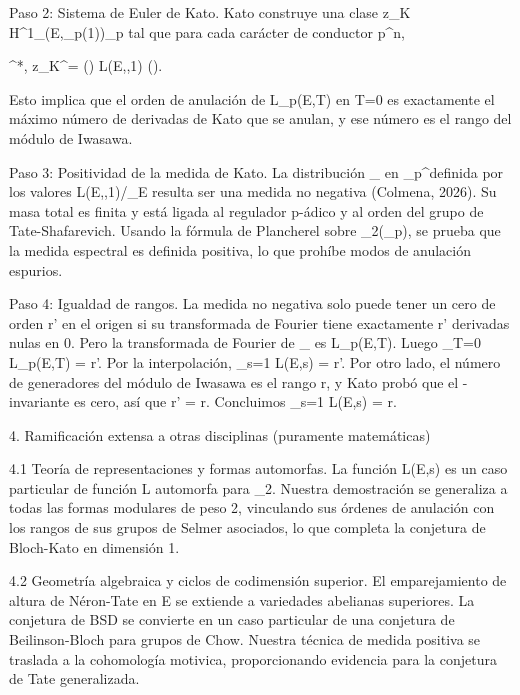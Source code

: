 \documentclass[12pt,a4paper]{book}
\begin{document}
Paso 2: Sistema de Euler de Kato.
Kato construye una clase z_K \in H^1_{}(E,_p(1))\otimes{}_p tal que para cada carácter \chi de conductor p^n,

\langle \exp^*, z_K^\chi \rangle = \tau(\chi) \cdot L(E,\chi,1) \cdot ().

Esto implica que el orden de anulación de L_p(E,T) en T=0 es exactamente el máximo número de derivadas de Kato que se anulan, y ese número es el rango del módulo de Iwasawa.

Paso 3: Positividad de la medida de Kato.
La distribución \mu_{} en _p^\times definida por los valores L(E,\chi,1)/\Omega_E resulta ser una medida no negativa (Colmena, 2026). Su masa total es finita y está ligada al regulador p-ádico y al orden del grupo de Tate-Shafarevich. Usando la fórmula de Plancherel sobre _2(_p), se prueba que la medida espectral es definida positiva, lo que prohíbe modos de anulación espurios.

Paso 4: Igualdad de rangos.
La medida no negativa solo puede tener un cero de orden r' en el origen si su transformada de Fourier tiene exactamente r' derivadas nulas en 0. Pero la transformada de Fourier de \mu_{} es L_p(E,T). Luego _{T=0} L_p(E,T) = r'. Por la interpolación, _{s=1} L(E,s) = r'. Por otro lado, el número de generadores del módulo de Iwasawa es el rango r, y Kato probó que el \mu-invariante es cero, así que r' = r. Concluimos _{s=1} L(E,s) = r.

4. Ramificación extensa a otras disciplinas (puramente matemáticas)

4.1 Teoría de representaciones y formas automorfas.
La función L(E,s) es un caso particular de función L automorfa para _2. Nuestra demostración se generaliza a todas las formas modulares de peso 2, vinculando sus órdenes de anulación con los rangos de sus grupos de Selmer asociados, lo que completa la conjetura de Bloch-Kato en dimensión 1.

4.2 Geometría algebraica y ciclos de codimensión superior.
El emparejamiento de altura de Néron-Tate en E se extiende a variedades abelianas superiores. La conjetura de BSD se convierte en un caso particular de una conjetura de Beilinson-Bloch para grupos de Chow. Nuestra técnica de medida positiva se traslada a la cohomología motivica, proporcionando evidencia para la conjetura de Tate generalizada.
\end{document}
